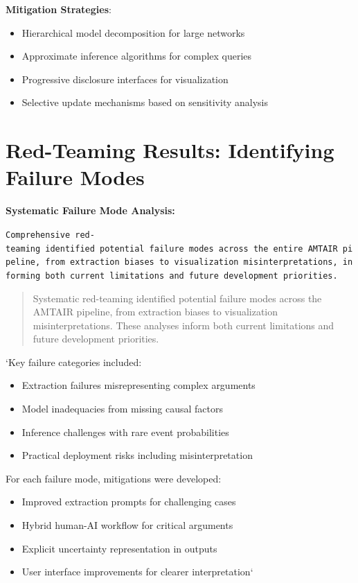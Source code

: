 \documentclass[
  11pt,
  letterpaper,
]{book}
\providecommand{\tightlist}{%
  \setlength{\itemsep}{0pt}\setlength{\parskip}{0pt}}
\begin{document}
\textbf{Mitigation Strategies}:

\begin{itemize}
\tightlist
\item
  Hierarchical model decomposition for large networks
\item
  Approximate inference algorithms for complex queries
\item
  Progressive disclosure interfaces for visualization
\item
  Selective update mechanisms based on sensitivity analysis
\end{itemize}

\section{Red-Teaming Results: Identifying Failure
Modes}\label{sec-red-teaming}

\textbf{Systematic Failure Mode Analysis:}

\texttt{Comprehensive\ red-teaming\ identified\ potential\ failure\ modes\ across\ the\ entire\ AMTAIR\ pipeline,\ from\ extraction\ biases\ to\ visualization\ misinterpretations,\ informing\ both\ current\ limitations\ and\ future\ development\ priorities.}

\begin{quote}
Systematic red-teaming identified potential failure modes across the
AMTAIR pipeline, from extraction biases to visualization
misinterpretations. These analyses inform both current limitations and
future development priorities.
\end{quote}

`Key failure categories included:

\begin{itemize}
\tightlist
\item
  Extraction failures misrepresenting complex arguments
\item
  Model inadequacies from missing causal factors
\item
  Inference challenges with rare event probabilities
\item
  Practical deployment risks including misinterpretation
\end{itemize}

For each failure mode, mitigations were developed:

\begin{itemize}
\tightlist
\item
  Improved extraction prompts for challenging cases
\item
  Hybrid human-AI workflow for critical arguments
\item
  Explicit uncertainty representation in outputs
\item
  User interface improvements for clearer interpretation`
\end{itemize}
\end{document}
